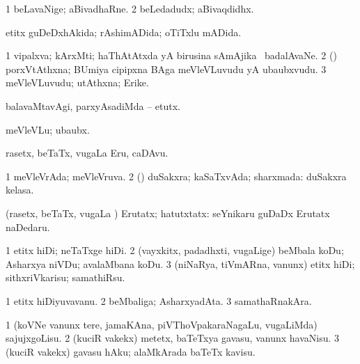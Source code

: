 \bentry
{} 
\gl{\nA}
\expl{}
\bmng
\bnum
\num{1} beLavaNige; aBivadhaRne. 
\num{2} beLedadudx; aBivaqdidhx. 
\enum
\emng
\eentry

\bentry
{} 
\gl{\gu}
\expl{}
\bmng
etitx guDeDxhAkida; rAshimADida; oTiTxlu mADida. 
\emng
\eentry

\bentry
{} 
\gl{\nA}
\expl{}
\bmng
\bnum
\num{1} vipalxva; kArxMti; haThAtAtxda yA birusina sAmAjika \mo\ badalAvaNe. 
\num{2} (\BUvi) porxVtAthxna; BUmiya cipipxna BAga meVleVLuvudu yA ubaubxvudu. 
\num{3} meVleVLuvudu; utAthxna; Erike. 
\enum
\emng
\eentry

\bentry
{} 
\gl{\akirx}
\expl{}
\bmng
balavaMtavAgi, parxyAsadiMda -- etutx. 
\emng

\noindent
\gl{\akirx}
\expl{}
\bmng
meVleVLu; ubaubx. 
\emng
\eentry

\bentry
{} 
\gl{\nA}
\expl{}
\bmng
rasetx, beTaTx, \mo vugaLa Eru, caDAvu. 
\emng
\eentry

\bentry
{} 
\gl{\gu}
\expl{}
\bmng
\bnum
\num{1} meVleVrAda; meVleVruva. 
\num{2} (\rUpa) duSakxra; kaSaTxvAda; sharxmada:  duSakxra kelasa. 
\enum
\emng
\eentry

\bentry
{} 
\gl{\kirxvi}
\expl{}
\bmng
(rasetx, beTaTx, \mo vugaLa \vi) Erutatx; hatutxtatx:  seYnikaru guDaDx Erutatx naDedaru. 
\emng
\eentry

\bentry
{} 
\gl{\sakirx}
\bmng
\bnum
\num{1} etitx hiDi; neTaTxge hiDi. 
\num{2} (vayxkitx, padadhxti, \mo vugaLige) beMbala koDu; Asharxya niVDu; avalaMbana koDu. 
\num{3} (niNaRya, tiVmARna, \mo vanunx) etitx hiDi; sithxriVkarisu; samathiRsu. 
\enum
\emng
\eentry

\bentry
{} 
\gl{\nA}
\expl{}
\bmng
\bnum
\num{1} etitx hiDiyuvavanu. 
\num{2} beMbaliga; AsharxyadAta. 
\num{3} samathaRnakAra. 
\enum
\emng
\eentry

\bentry
{} 
\gl{\sakirx}
\expl{}
\bmng
\bnum
\num{1} (koVNe \mo vanunx tere, jamaKAna, piVThoVpakaraNagaLu, \mo vugaLiMda) sajujxgoLisu. 
\num{2} (kuciR \mo vakekx) metetx, baTeTxya gavasu, \mo vanunx havaNisu. 
\num{3} (kuciR \mo vakekx) gavasu hAku; alaMkArada baTeTx kavisu. 
\enum
\emng

